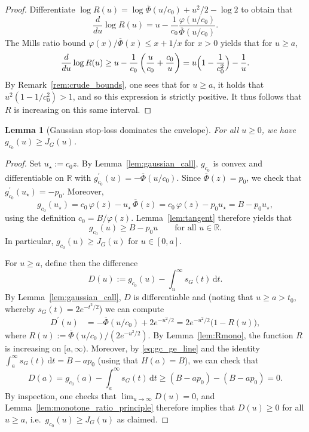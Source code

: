\documentclass[11pt]{article}
\newcommand{\R}{\mathbb{R}}
\newtheorem{lemma}[theorem]{Lemma}
\newcommand{\phin}{\varphi}
\newcommand{\Phib}{\overline{\Phi}}
\begin{document}
\begin{proof}
Differentiate $\log R(u) = \log \Phib (u / c_0) + u^2/2 - \log 2$ to obtain that
%
\[
\frac{d}{du} \log R(u) = u - \frac{1}{c_0} \frac{\phin(u/c_0)}{\Phib(u/c_0)}.
\]
%
The Mills ratio bound $\phin(x)/\Phib(x)\le x+1/x$ for $x>0$
\cite[Eq.~7.1.13]{AbramowitzStegun} yields that for $u\ge a$,
%
\[
\frac{d}{du}\log R(u)
\ge u - \frac{1}{c_0} \left(\frac{u}{c_0} + \frac{c_0}{u}\right)
= u \Bigl(1 - \frac{1}{c_0^2}\Bigr) - \frac{1}{u}.
\]
%
By Remark~\ref{rem:crude_bounds}, one sees that for $u\ge a$, it holds that $u^2(1-1/c_0^2)>1$, and so this expression is strictly positive.
It thus follows that $R$ is increasing on this same interval.
\end{proof}

\begin{lemma}[Gaussian stop-loss dominates the envelope]\label{lem:gauss_ge_J}
For all $u \ge 0$, we have $g_{c_0} (u) \ge J_G (u)$.
\end{lemma}

\begin{proof}
Set $u_\star := c_0 z$. 
By Lemma~\ref{lem:gaussian_call}, $g_{c_0}$ is convex and differentiable on $\R$ with
$g_{c_0}^{\prime}(u) = - \Phib(u/c_0)$. 
Since $\Phib(z) = p_0$, we check that $g_{c_0}^{\prime}(u_\star) = - p_0$. 
Moreover,
%
\[
g_{c_0} (u_\star)
=c_0 \, \phin(z) - u_\star \, \Phib(z)
=c_0 \, \phin(z) - p_0 u_\star
=B - p_0 u_\star,
\]
%
using the definition $c_0 = B/ \phin(z)$. Lemma~\ref{lem:tangent} therefore yields that
%
\begin{equation}\label{eq:gc_ge_line}
g_{c_0}(u) \ge B - p_0 u \qquad \text{for all } u \in \R.
\end{equation}
%
In particular, $g_{c_0}(u) \ge J_G(u)$ for $u \in [0,a]$.

For $u \ge a$, define then the difference
%
\[
D(u) := g_{c_0} (u)- \int_u^\infty s_G (t) \, \mathrm{d}t.
\]
%
By Lemma~\ref{lem:gaussian_call}, $D$ is differentiable and (noting that $u \ge a > t_0$, whereby $s_G(t) = 2 e^{-t^2/2}$) we can compute
%
\begin{align*}
D^{\prime} (u)
&= - \Phib (u/c_0) + 2e^{-u^2/2}
= 2e^{-u^2/2} \bigl(1 - R (u) \bigr),
\end{align*}
%
where $R (u) := \Phib(u/c_0)\big/(2e^{-u^2/2})$. 
By Lemma~\ref{lem:Rmono}, the function $R$ is increasing on
$[a, \infty)$. 
Moreover, by \eqref{eq:gc_ge_line} and the identity $\int_a^\infty s_G (t) \, \mathrm{d}t = B - a p_0$ (using that $H(a) = B$), we can check that
%
\[
D (a) = g_{c_0} (a) - \int_a^\infty s_G (t) \, \mathrm{d}t \ge (B - a p_0) - (B -a p_0) = 0.
\]
%
By inspection, one checks that $\lim_{u\to\infty} D (u) = 0$, and Lemma~\ref{lem:monotone_ratio_principle} therefore implies that $D (u) \ge 0$ for all $u\ge a$, i.e.\ $g_{c_0}(u) \ge J_G(u)$ as claimed.
\end{proof}
\end{document}
